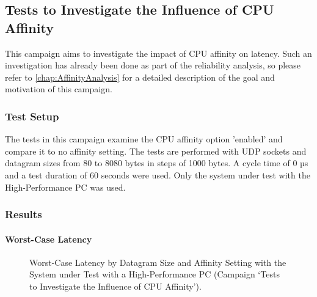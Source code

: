 \subsection{Tests to Investigate the Influence of CPU Affinity}
This campaign aims to investigate the impact of CPU affinity on latency. Such an investigation has already been done as part of the reliability analysis, so please refer to \ref{chap:AffinityAnalysis} for a detailed description of the goal and motivation of this campaign.

\subsubsection{Test Setup}
The tests in this campaign examine the CPU affinity option 'enabled' and compare it to no affinity setting. The tests are performed with UDP sockets and datagram sizes from 80 to 8080 bytes in steps of 1000 bytes. A cycle time of 0 µs and a test duration of 60 seconds were used. Only the system under test with the High-Performance PC was used.

\subsubsection{Results}
\paragraph{Worst-Case Latency}

\begin{figure}[h!]
  \centering
  \caption{Worst-Case Latency by Datagram Size and Affinity Setting with the System under Test with a High-Performance PC (Campaign `Tests to Investigate the Influence of CPU Affinity').}
  \label{fig:AffWc}
\end{figure}

